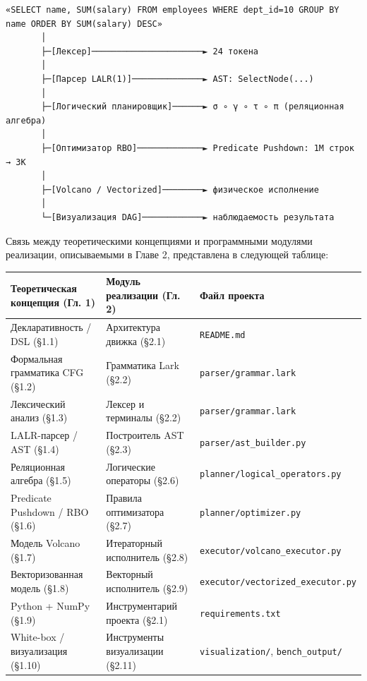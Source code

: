 \documentclass[a4paper,12pt]{report}
\begin{document}
{\begin{verbatim}
«SELECT name, SUM(salary) FROM employees WHERE dept_id=10 GROUP BY name ORDER BY SUM(salary) DESC»
       │
       ├─[Лексер]──────────────────────► 24 токена
       │
       ├─[Парсер LALR(1)]──────────────► AST: SelectNode(...)
       │
       ├─[Логический планировщик]──────► σ ∘ γ ∘ τ ∘ π (реляционная алгебра)
       │
       ├─[Оптимизатор RBO]─────────────► Predicate Pushdown: 1M строк → 3K
       │
       ├─[Volcano / Vectorized]────────► физическое исполнение
       │
       └─[Визуализация DAG]────────────► наблюдаемость результата
\end{verbatim}

Связь между теоретическими концепциями и программными модулями реализации, описываемыми в Главе 2, представлена в следующей таблице:

\begin{longtable}{|l|l|l|}
\hline
Теоретическая концепция (Гл. 1) & Модуль реализации (Гл. 2) & Файл проекта \\ \hline
Декларативность / DSL (§1.1) & Архитектура движка (§2.1) & \texttt{README.md} \\ \hline
Формальная грамматика CFG (§1.2) & Грамматика Lark (§2.2) & \texttt{parser/grammar.lark} \\ \hline
Лексический анализ (§1.3) & Лексер и терминалы (§2.2) & \texttt{parser/grammar.lark} \\ \hline
LALR-парсер / AST (§1.4) & Построитель AST (§2.3) & \texttt{parser/ast\_builder.py} \\ \hline
Реляционная алгебра (§1.5) & Логические операторы (§2.6) & \texttt{planner/logical\_operators.py} \\ \hline
Predicate Pushdown / RBO (§1.6) & Правила оптимизатора (§2.7) & \texttt{planner/optimizer.py} \\ \hline
Модель Volcano (§1.7) & Итераторный исполнитель (§2.8) & \texttt{executor/volcano\_executor.py} \\ \hline
Векторизованная модель (§1.8) & Векторный исполнитель (§2.9) & \texttt{executor/vectorized\_executor.py} \\ \hline
Python + NumPy (§1.9) & Инструментарий проекта (§2.1) & \texttt{requirements.txt} \\ \hline
White-box / визуализация (§1.10) & Инструменты визуализации (§2.11) & \texttt{visualization/}, \texttt{bench\_output/} \\ \hline
\end{longtable}

}
\end{document}
